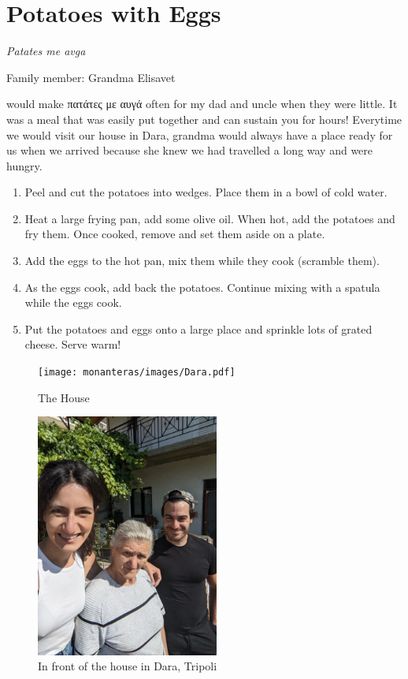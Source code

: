 \chapter{Potatoes with Eggs}
\label{ch:eggswithpotatoes}
\textit{Patates me avga}

Family member: Grandma Elisavet

 would make \textgreek{πατάτες με αυγά} often for my dad and uncle when they were little. It was a meal that was easily put together and can sustain you for hours! Everytime we would visit our house in Dara, grandma would always have a place ready for us when we arrived because she knew we had travelled a long way and were hungry.

\begin{enumerate}
    \item Peel and cut the potatoes into wedges. Place them in a bowl of cold water.
    \item Heat a large frying pan, add some olive oil. When hot, add the potatoes and fry them. Once cooked, remove and set them aside on a plate.
    \item Add the eggs to the hot pan, mix them while they cook (scramble them). 
    \item As the eggs cook, add back the potatoes. Continue mixing with a spatula while the eggs cook.
    \item Put the potatoes and eggs onto a large place and sprinkle lots of grated cheese. Serve warm!
\end{enumerate}

\begin{figure}
  \texttt{[image: monanteras/images/Dara.pdf]}
  \caption{The House}
  \includegraphics[width=60mm]{monanteras/images/Grandma elisavet.jpg}
  \caption{In front of the house in Dara, Tripoli}
\end{figure}
